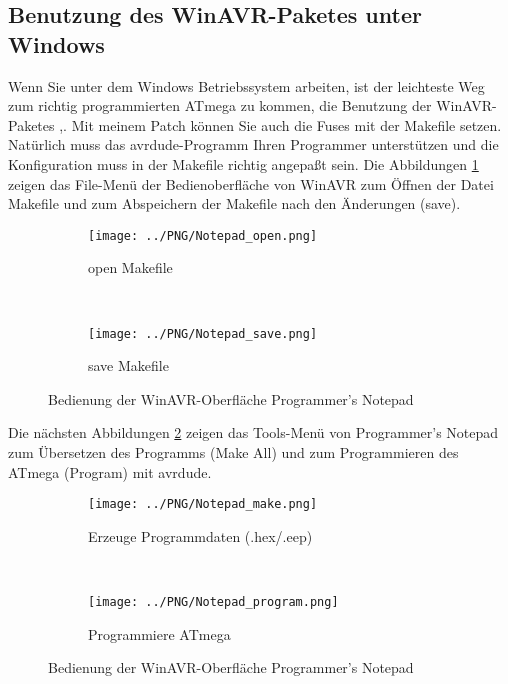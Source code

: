 \newpage
\subsection{Benutzung des WinAVR-Paketes unter Windows}

Wenn Sie unter dem Windows Betriebssystem arbeiten, ist der leichteste Weg zum
richtig programmierten ATmega zu kommen, die Benutzung der WinAVR-Paketes \cite{winavr1},\cite{winavr2}.
Mit meinem Patch \cite{winavr3} können Sie auch die Fuses mit der Makefile setzen.
Natürlich muss das avrdude-Programm Ihren Programmer unterstützen und die Konfiguration muss in
der Makefile richtig angepaßt sein.
Die Abbildungen \ref{fig:WinAVR1} zeigen das File-Menü der Bedienoberfläche von WinAVR zum
Öffnen der Datei Makefile und zum Abspeichern der Makefile nach den Änderungen (save).

\begin{figure}[H]
  \begin{subfigure}[b]{8,5cm}
    \centering
    \texttt{[image: ../PNG/Notepad\_open.png]}
    \caption{open Makefile}
  \end{subfigure}
  ~
  \begin{subfigure}[b]{8,5cm}
    \centering
    \texttt{[image: ../PNG/Notepad\_save.png]}
    \caption{save Makefile}
  \end{subfigure}
  \caption{Bedienung der WinAVR-Oberfläche Programmer's Notepad}
  \label{fig:WinAVR1}
\end{figure}
Die nächsten Abbildungen \ref{fig:WinAVR2} zeigen das Tools-Menü von Programmer's Notepad
zum Übersetzen des Programms (Make All) und zum Programmieren des ATmega (Program) mit avrdude.

\begin{figure}[H]
  \begin{subfigure}[b]{8,5cm}
    \centering
    \texttt{[image: ../PNG/Notepad\_make.png]}
    \caption{Erzeuge Programmdaten (.hex/.eep)}
  \end{subfigure}
  ~
  \begin{subfigure}[b]{8,5cm}
    \centering
    \texttt{[image: ../PNG/Notepad\_program.png]}
    \caption{Programmiere ATmega}
  \end{subfigure}
  \caption{Bedienung der WinAVR-Oberfläche Programmer's Notepad}
  \label{fig:WinAVR2}
\end{figure}

